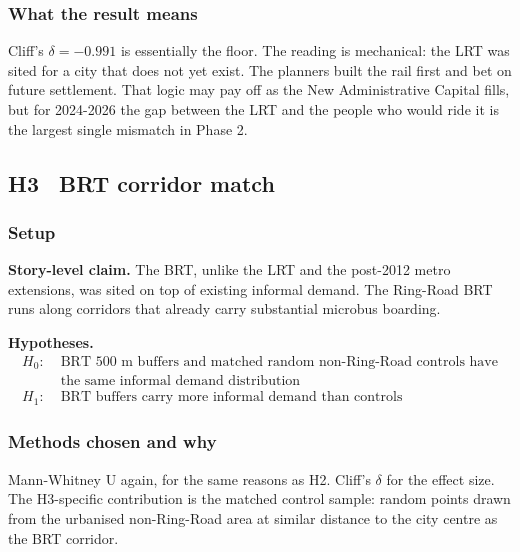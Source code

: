 
\subsubsection{What the result means}

\begin{callout}
Cliff's $\delta = -0.991$ is essentially the floor. The reading is
mechanical: the LRT was sited for a city that does not yet exist. The
planners built the rail first and bet on future settlement. That
logic may pay off as the New Administrative Capital fills, but for
2024-2026 the gap between the LRT and the people who would ride it
is the largest single mismatch in Phase 2.
\end{callout}

\subsection{H3 \textbullet\ BRT corridor match}
\label{sec:h3}

\subsubsection{Setup}

\textbf{Story-level claim.} The BRT, unlike the LRT and the post-2012
metro extensions, was sited on top of existing informal demand. The
Ring-Road BRT runs along corridors that already carry substantial
microbus boarding.

\textbf{Hypotheses.}
\begin{align*}
  H_0:\;& \text{BRT 500 m buffers and matched random non-Ring-Road controls have} \\
        & \text{the same informal demand distribution} \\
  H_1:\;& \text{BRT buffers carry more informal demand than controls}
\end{align*}

\subsubsection{Methods chosen and why}

Mann-Whitney U again, for the same reasons as H2. Cliff's $\delta$
for the effect size. The H3-specific contribution is the matched
control sample: random points drawn from the urbanised non-Ring-Road
area at similar distance to the city centre as the BRT corridor.

